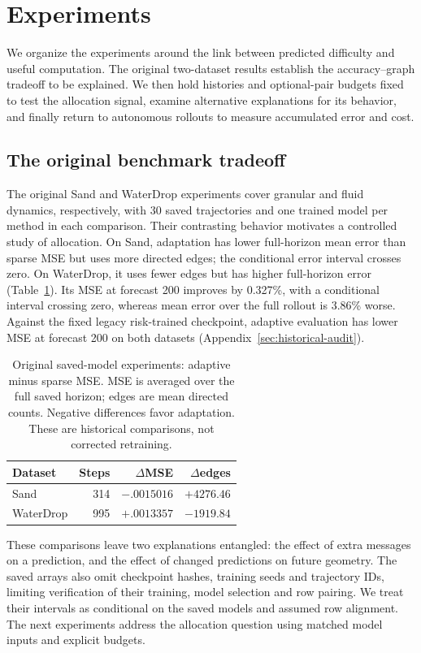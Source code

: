 \section{Experiments}
We organize the experiments around the link between predicted difficulty and useful computation. The original two-dataset results establish the accuracy--graph tradeoff to be explained. We then hold histories and optional-pair budgets fixed to test the allocation signal, examine alternative explanations for its behavior, and finally return to autonomous rollouts to measure accumulated error and cost.

\subsection{The original benchmark tradeoff}
The original Sand and WaterDrop experiments cover granular and fluid dynamics, respectively, with 30 saved trajectories and one trained model per method in each comparison. Their contrasting behavior motivates a controlled study of allocation. On Sand, adaptation has lower full-horizon mean error than sparse MSE but uses more directed edges; the conditional error interval crosses zero. On WaterDrop, it uses fewer edges but has higher full-horizon error (Table~\ref{tab:historical-main}). Its MSE at forecast 200 improves by 0.327\%, with a conditional interval crossing zero, whereas mean error over the full rollout is 3.86\% worse. Against the fixed legacy risk-trained checkpoint, adaptive evaluation has lower MSE at forecast 200 on both datasets (Appendix~\ref{sec:historical-audit}).

\begin{table}[t]
\centering\small
\caption{Original saved-model experiments: adaptive minus sparse MSE. MSE is averaged over the full saved horizon; edges are mean directed counts. Negative differences favor adaptation. These are historical comparisons, not corrected retraining.}
\label{tab:historical-main}
\begin{tabular}{lrrr}
\toprule
Dataset & Steps & $\Delta$MSE & $\Delta$edges\\
\midrule
Sand & 314 & $-.0015016$ & $+4276.46$\\
WaterDrop & 995 & $+.0013357$ & $-1919.84$\\
\bottomrule
\end{tabular}
\end{table}

These comparisons leave two explanations entangled: the effect of extra messages on a prediction, and the effect of changed predictions on future geometry. The saved arrays also omit checkpoint hashes, training seeds and trajectory IDs, limiting verification of their training, model selection and row pairing. We treat their intervals as conditional on the saved models and assumed row alignment. The next experiments address the allocation question using matched model inputs and explicit budgets.

